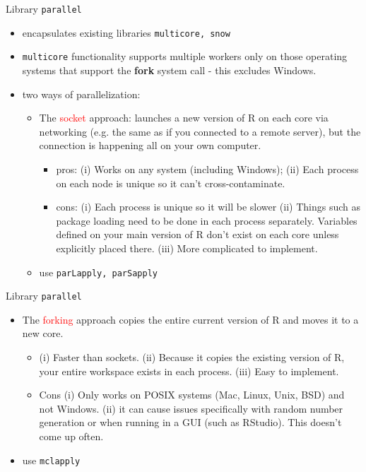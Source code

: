 \documentclass[compress,xcolor=table]{beamer}
\newcommand{\CoG}{\textcolor{red}}
\begin{document}
\begin{frame}{Library {\tt parallel}}
\small 
\begin{itemize}
	\item encapsulates existing libraries {\tt multicore, snow}
	\item {\tt multicore}  functionality supports multiple workers only on those operating systems that support the  {\bf fork} system call - this excludes Windows. 
	
	\item two ways of parallelization:
	\begin{itemize}
		\item 
		The \CoG{socket} approach:  launches a new version of R on each core via networking (e.g. the same as if you connected to a remote server), but the connection is happening all on your own computer.
		\begin{itemize}
			\item pros: (i) Works on any system (including Windows); (ii) Each process on each node is unique so it can’t cross-contaminate.
			\item cons: (i) Each process is unique so it will be slower
			(ii) Things such as package loading need to be done in each process separately. Variables defined on your main version of R don’t exist on each core unless explicitly placed there.
			(iii) More complicated to implement.
		\end{itemize}
		\item use {\tt parLapply, parSapply}
		
		
	\end{itemize}
	
\end{itemize}

\end{frame}



\begin{frame}{Library {\tt parallel}}
\small 
\begin{itemize}
	
	\item The \CoG{forking} approach copies the entire current version of R and moves it to a new core.
	\begin{itemize}
		\item      (i) Faster than sockets.
		(ii) Because it copies the existing version of R, your entire workspace exists in each process.
		(iii) Easy to implement.
		\item 
		Cons (i) Only works on POSIX systems (Mac, Linux, Unix, BSD) and not Windows.
		(ii) it can cause issues specifically with random number generation 
		or when running in a GUI (such as RStudio). This doesn’t come up often.
	\end{itemize}
	\item use {\tt mclapply}
\end{itemize}

\end{frame}
\end{document}
